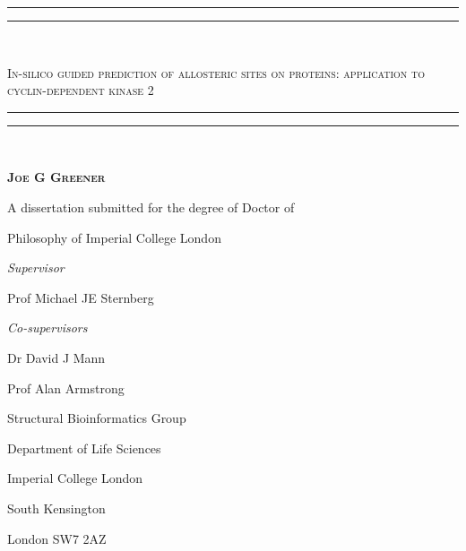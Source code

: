 \documentclass[12pt]{report}
\begin{document}
\onehalfspacing

\begin{titlepage}
\thispagestyle{plain}
\centering
\singlespacing
\settowidth{\unitlength}{\LARGE xxxxxxxxxxxxxxxxxxxxxxxxxxxxxxxxxx}
\rule{\unitlength}{1.6pt}\vspace*{-\baselineskip}\vspace*{2pt}
\rule{\unitlength}{0.4pt}\\[\baselineskip]
{\scshape\LARGE In-silico guided prediction of allosteric sites on proteins: application to cyclin-dependent kinase 2\par}
\rule{\unitlength}{0.4pt}\vspace*{-\baselineskip}\vspace{3.2pt}
\rule{\unitlength}{1.6pt}\\[\baselineskip]
\vspace{1.0cm}
{\scshape\Large \textbf{Joe G Greener}\par}
\vspace{1.0cm}
{\large A dissertation submitted for the degree of Doctor of\par}
{\large Philosophy of Imperial College London\par}
\vspace{1.0cm}

\onehalfspacing
\begin{minipage}[t]{7cm}
\flushleft
{\large \textit{Supervisor}\par}
{\large Prof Michael JE Sternberg\par}
\end{minipage}
\hfill
\begin{minipage}[t]{7cm}
\flushright
{\large \textit{Co-supervisors}\par}
{\large Dr David J Mann\par}
{\large Prof Alan Armstrong\par}
\end{minipage}

\vspace{1.0cm}
{\large Structural Bioinformatics Group\par}
{\large Department of Life Sciences\par}
{\large Imperial College London\par}
{\large South Kensington\par}
{\large London SW7 2AZ\par}
\end{titlepage}

\setcounter{page}{2}

\end{document}
